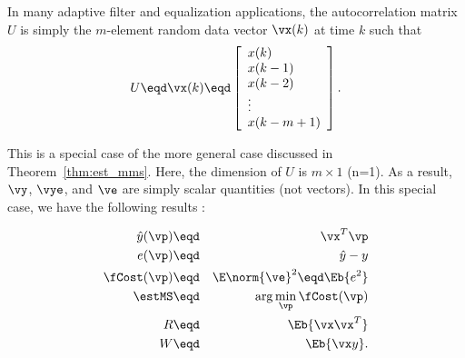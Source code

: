 {%
\begin{example}
In many adaptive filter and equalization applications,
the autocorrelation matrix $U$ is simply the $m$-element
random data vector $\vx(k)$ at time $k$ such that
\[
   U \eqd \vx(k) \eqd
   \left[\begin{array}{l}
      x(k) \\
      x(k-1) \\
      x(k-2) \\
      \vdots \\
      x(k-m+1)
   \end{array}\right].
\]

This is a special case of the more general case discussed
in Theorem~\ref{thm:est_mms}.
Here, the dimension of $U$ is $m\times1$ (n=1).
As a result,
$\vy$, $\vye$, and $\ve$ are simply scalar quantities (not vectors).
In this special case, we have the following results
:

\begin{align*}
   \hat{y}(\vp)   &\eqd& \vx^T \vp    \\
   e(\vp)    &\eqd& \hat{y}-y \\
   \fCost(\vp) &\eqd& \E\norm{\ve}^2 \eqd \Eb{e^2} \\
   \estMS      &\eqd& \arg\min_\vp \fCost(\vp)  \\
   R           &\eqd& \Eb{\vx\vx^T}   \\
   W           &\eqd& \Eb{ \vx y }.
\end{align*}

\end{example}


}

